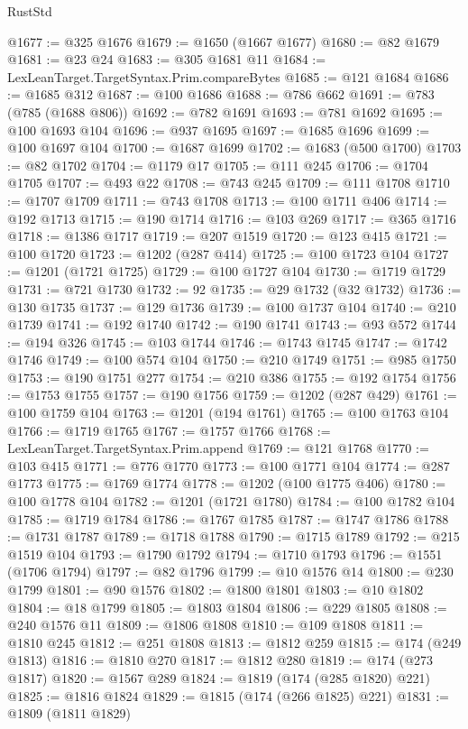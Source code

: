 \begin{lexlean}{RustStd}
\begin{coremodule}
{\begin{coremodule}
{{{{{{{{{{{{{{{{{{{{{{{{{{{{{{{{{{{{{{{{{{{{{{{{{{{{{{{@1677 := @325 @1676
@1679 := @1650 (@1667 @1677)
@1680 := @82 @1679
@1681 := @23 @24
@1683 := @305 @1681 @11
@1684 := LexLeanTarget.TargetSyntax.Prim.compareBytes
@1685 := @121 @1684
@1686 := @1685 @312
@1687 := @100 @1686
@1688 := @786 @662
@1691 := @783 (@785 (@1688 @806))
@1692 := @782 @1691
@1693 := @781 @1692
@1695 := @100 @1693 @104
@1696 := @937 @1695
@1697 := @1685 @1696
@1699 := @100 @1697 @104
@1700 := @1687 @1699
@1702 := @1683 (@500 @1700)
@1703 := @82 @1702
@1704 := @1179 @17
@1705 := @111 @245
@1706 := @1704 @1705
@1707 := @493 @22
@1708 := @743 @245
@1709 := @111 @1708
@1710 := @1707 @1709
@1711 := @743 @1708
@1713 := @100 @1711 @406
@1714 := @192 @1713
@1715 := @190 @1714
@1716 := @103 @269
@1717 := @365 @1716
@1718 := @1386 @1717
@1719 := @207 @1519
@1720 := @123 @415
@1721 := @100 @1720
@1723 := @1202 (@287 @414)
@1725 := @100 @1723 @104
@1727 := @1201 (@1721 @1725)
@1729 := @100 @1727 @104
@1730 := @1719 @1729
@1731 := @721 @1730
@1732 := 92
@1735 := @29 @1732 (@32 @1732)
@1736 := @130 @1735
@1737 := @129 @1736
@1739 := @100 @1737 @104
@1740 := @210 @1739
@1741 := @192 @1740
@1742 := @190 @1741
@1743 := @93 @572
@1744 := @194 @326
@1745 := @103 @1744
@1746 := @1743 @1745
@1747 := @1742 @1746
@1749 := @100 @574 @104
@1750 := @210 @1749
@1751 := @985 @1750
@1753 := @190 @1751 @277
@1754 := @210 @386
@1755 := @192 @1754
@1756 := @1753 @1755
@1757 := @190 @1756
@1759 := @1202 (@287 @429)
@1761 := @100 @1759 @104
@1763 := @1201 (@194 @1761)
@1765 := @100 @1763 @104
@1766 := @1719 @1765
@1767 := @1757 @1766
@1768 := LexLeanTarget.TargetSyntax.Prim.append
@1769 := @121 @1768
@1770 := @103 @415
@1771 := @776 @1770
@1773 := @100 @1771 @104
@1774 := @287 @1773
@1775 := @1769 @1774
@1778 := @1202 (@100 @1775 @406)
@1780 := @100 @1778 @104
@1782 := @1201 (@1721 @1780)
@1784 := @100 @1782 @104
@1785 := @1719 @1784
@1786 := @1767 @1785
@1787 := @1747 @1786
@1788 := @1731 @1787
@1789 := @1718 @1788
@1790 := @1715 @1789
@1792 := @215 @1519 @104
@1793 := @1790 @1792
@1794 := @1710 @1793
@1796 := @1551 (@1706 @1794)
@1797 := @82 @1796
@1799 := @10 @1576 @14
@1800 := @230 @1799
@1801 := @90 @1576
@1802 := @1800 @1801
@1803 := @10 @1802
@1804 := @18 @1799
@1805 := @1803 @1804
@1806 := @229 @1805
@1808 := @240 @1576 @11
@1809 := @1806 @1808
@1810 := @109 @1808
@1811 := @1810 @245
@1812 := @251 @1808
@1813 := @1812 @259
@1815 := @174 (@249 @1813)
@1816 := @1810 @270
@1817 := @1812 @280
@1819 := @174 (@273 @1817)
@1820 := @1567 @289
@1824 := @1819 (@174 (@285 @1820) @221)
@1825 := @1816 @1824
@1829 := @1815 (@174 (@266 @1825) @221)
@1831 := @1809 (@1811 @1829)
}}}}}}}}}}}}}}}}}}}}}}}}}}}}}}}}}}}}}}}}}}}}}}}}}}}}}}}
\end{coremodule}}
\end{coremodule}
\end{lexlean}
